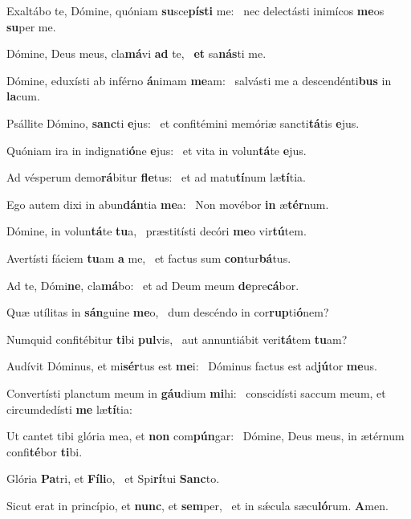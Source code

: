 \item Exaltábo te, Dómine, quóniam \textbf{su}sce\textbf{pís}\textbf{ti} me:~\psstar{} nec delectásti inimícos \textbf{me}os \textbf{su}per me.
\item Dómine, Deus meus, cla\textbf{má}vi \textbf{ad} te,~\psstar{} \textbf{et} sa\textbf{nás}ti me.
\item Dómine, eduxísti ab inférno \textbf{á}nimam \textbf{me}am:~\psstar{} salvásti me a descendénti\textbf{bus} in \textbf{la}cum.
\item Psállite Dómino, \textbf{sanc}ti \textbf{e}jus:~\psstar{} et confitémini memóriæ sancti\textbf{tá}tis \textbf{e}jus.
\item Quóniam ira in indignati\textbf{ó}ne \textbf{e}jus:~\psstar{} et vita in volun\textbf{tá}te \textbf{e}jus.
\item Ad vésperum demo\textbf{rá}bitur \textbf{fle}tus:~\psstar{} et ad matu\textbf{tí}num læ\textbf{tí}tia.
\item Ego autem dixi in abun\textbf{dán}tia \textbf{me}a:~\psstar{} Non movébor \textbf{in} æ\textbf{tér}num.
\item Dómine, in volun\textbf{tá}te \textbf{tu}a,~\psstar{} præstitísti decóri \textbf{me}o vir\textbf{tú}tem.
\item Avertísti fáciem \textbf{tu}am \textbf{a} me,~\psstar{} et factus sum \textbf{con}tur\textbf{bá}tus.
\item Ad te, Dómi\textbf{ne}, cla\textbf{má}bo:~\psstar{} et ad Deum meum \textbf{de}pre\textbf{cá}bor.
\item Quæ utílitas in \textbf{sán}guine \textbf{me}o,~\psstar{} dum descéndo in cor\textbf{rup}ti\textbf{ó}nem?
\item Numquid confitébitur \textbf{ti}bi \textbf{pul}vis,~\psstar{} aut annuntiábit veri\textbf{tá}tem \textbf{tu}am?
\item Audívit Dóminus, et mi\textbf{sér}tus est \textbf{me}i:~\psstar{} Dóminus factus est ad\textbf{jú}tor \textbf{me}us.
\item Convertísti planctum meum in \textbf{gáu}dium \textbf{mi}hi:~\psstar{} conscidísti saccum meum, et circumdedísti \textbf{me} læ\textbf{tí}tia:
\item Ut cantet tibi glória mea, et \textbf{non} com\textbf{pún}gar:~\psstar{} Dómine, Deus meus, in ætérnum confi\textbf{té}bor \textbf{ti}bi.
\item Glória \textbf{Pa}tri, et \textbf{Fí}\textbf{li}o,~\psstar{} et Spi\textbf{rí}tui \textbf{Sanc}to.
\item Sicut erat in princípio, et \textbf{nunc}, et \textbf{sem}per,~\psstar{} et in sǽcula sæcu\textbf{ló}rum. \textbf{A}men.
